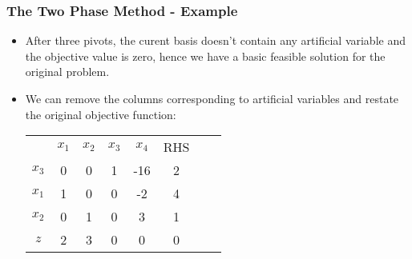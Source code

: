 \documentclass{beamer}
\theoremstyle{plain}
\begin{document}
\begin{frame}\frametitle{The Two Phase Method - Example}
\justifying

\begin{itemize}
\justifying

\item After three pivots, the curent basis doesn't contain any artificial variable and the objective value is zero, hence we have a basic feasible solution for the original problem. 

\item We can remove the columns corresponding to artificial variables and restate the original objective function:
\begin{center}
\begin{tabular}{c|cccc|ccc}	
& $ x_1 $ & $ x_2 $ & $ x_3 $ & $ x_4 $ & {\tiny RHS}  && \\
\cline{1-8} $ x_3 $ & 0 & 0 & 1 & -16 &  2 & & \\	
 $ x_1 $ & 1 & 0 & 0 & -2 &  4 & & \\	
$ x_2 $ & 0 & 1 & 0 & 3 &  1 & & \\
\cline{1-8}	
$ z $ & 2 & 3 & 0 & 0 &  0  & & \\
\end{tabular}
\end{center}

\end{itemize}

\end{frame}
\end{document}
